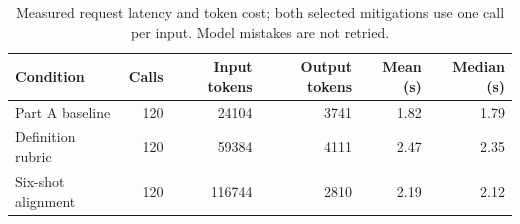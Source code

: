 \begin{table}[H]\centering\small
\begin{tabular}{lrrrrr}
\toprule
Condition & Calls & Input tokens & Output tokens & Mean (s) & Median (s)\\
\midrule
Part A baseline & 120 & 24104 & 3741 & 1.82 & 1.79\\
Definition rubric & 120 & 59384 & 4111 & 2.47 & 2.35\\
Six-shot alignment & 120 & 116744 & 2810 & 2.19 & 2.12\\
\bottomrule\end{tabular}
\caption{Measured request latency and token cost; both selected mitigations use one call per input. Model mistakes are not retried.}
\end{table}
